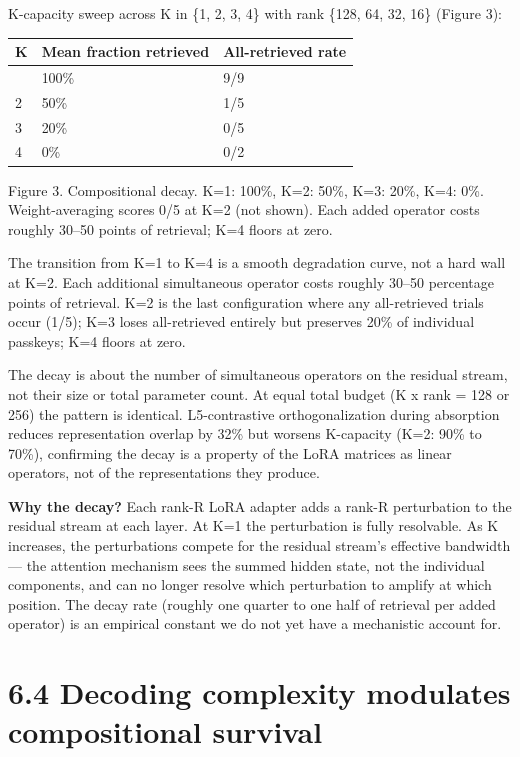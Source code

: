 K-capacity sweep across K in \{1, 2, 3, 4\} with rank \{128, 64, 32, 16\} (Figure 3):

{\def\LTcaptype{none} %
\begin{longtable}[]{@{}lll@{}}
\toprule\noalign{}
K & Mean fraction retrieved & All-retrieved rate \\
\midrule\noalign{}
\endhead
\bottomrule\noalign{}
\endlastfoot
1 & 100\% & 9/9 \\
2 & 50\% & 1/5 \\
3 & 20\% & 0/5 \\
4 & 0\% & 0/2 \\
\end{longtable}
}

Figure 3. Compositional decay. K=1: 100\%, K=2: 50\%, K=3: 20\%, K=4: 0\%. Weight-averaging scores 0/5 at K=2 (not shown). Each added operator costs roughly 30--50 points of retrieval; K=4 floors at zero.

The transition from K=1 to K=4 is a smooth degradation curve, not a hard wall at K=2. Each additional simultaneous operator costs roughly 30--50 percentage points of retrieval. K=2 is the last configuration where any all-retrieved trials occur (1/5); K=3 loses all-retrieved entirely but preserves 20\% of individual passkeys; K=4 floors at zero.

The decay is about the number of simultaneous operators on the residual stream, not their size or total parameter count. At equal total budget (K x rank = 128 or 256) the pattern is identical. L5-contrastive orthogonalization during absorption reduces representation overlap by 32\% but worsens K-capacity (K=2: 90\% to 70\%), confirming the decay is a property of the LoRA matrices as linear operators, not of the representations they produce.

\textbf{Why the decay?} Each rank-R LoRA adapter adds a rank-R perturbation to the residual stream at each layer. At K=1 the perturbation is fully resolvable. As K increases, the perturbations compete for the residual stream's effective bandwidth --- the attention mechanism sees the summed hidden state, not the individual components, and can no longer resolve which perturbation to amplify at which position. The decay rate (roughly one quarter to one half of retrieval per added operator) is an empirical constant we do not yet have a mechanistic account for.

\section{6.4 Decoding complexity modulates compositional survival}\label{decoding-complexity-modulates-compositional-survival}

